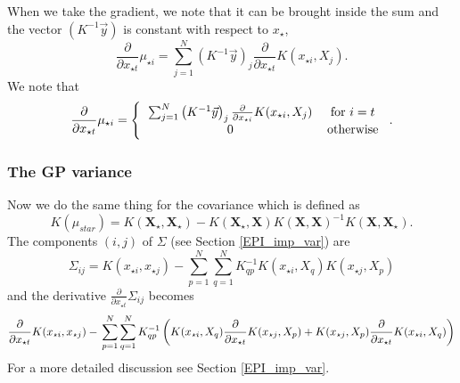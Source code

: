 When we take the gradient, we note that it can be brought inside the sum and the vector $(K^{-1}\vec{y})$ is constant with respect to $x_{\star}$,
\begin{equation}
 \frac{\partial}{\partial x_{\star t}} \mu_{\star i} = \sum_{j = 1}^{N} \left(K^{-1} \vec{y} \right)_{j} \frac{\partial}{\partial x_{\star t}} K(x_{\star i}, X_{j}).
\end{equation}
We note that
\begin{equation}
\frac{\partial}{\partial x_{\star t}} \mu_{\star i} = \left\{ \begin{tabular}{cc}
                                                                  $\sum_{j = 1}^{N} \left(K^{-1} \vec{y} \right)_{j} \frac{\partial}{\partial x_{\star i}} K(x_{\star i}, X_{j})$ & for $i = t$ \\
								  0 & otherwise
                                                                 \end{tabular}\right..
\end{equation}

\subsubsection{The GP variance}
\label{methods_GP_var}

Now we do the same thing for the covariance which is defined as
\begin{equation}
 K(\mu_{star}) = K(\textbf{X$_{\star}$}, \textbf{X$_{\star}$}) - K(\textbf{X$_{\star}$}, \textbf{X}) K(\textbf{X}, \textbf{X})^{-1} K(\textbf{X}, \textbf{X$_{\star}$}).
\end{equation}
The components $(i,j)$ of $\Sigma$ (see Section \ref{EPI_imp_var}) are
\begin{equation}
 \Sigma_{ij} = K(x_{\star i}, x_{\star j}) - \sum_{p = 1}^{N} \sum_{q = 1}^{N} K^{-1}_{qp} K(x_{\star i}, X_{q}) K(x_{\star j}, X_{p})
\end{equation}
and the derivative $\frac{\partial}{\partial x_{\star t}} \Sigma_{ij}$ becomes
\begin{equation}
 \frac{\partial}{\partial x_{\star t}} K(x_{\star i}, x_{\star j}) - \\
 \sum_{p = 1}^{N} \sum_{q = 1}^{N} K^{-1}_{qp} \left( K(x_{\star i}, X_{q}) \frac{\partial}{\partial x_{\star t}} K(x_{\star j}, X_{p}) + K(x_{\star j}, X_{p}) \frac{\partial}{\partial x_{\star t}} K(x_{\star i}, X_{q}) \right)
\end{equation}
For a more detailed discussion see Section \ref{EPI_imp_var}.

